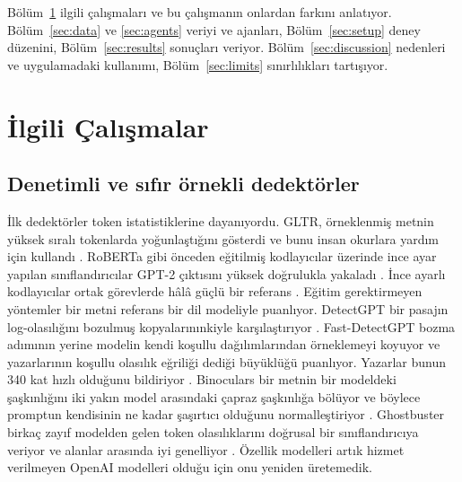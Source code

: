 \documentclass[journal]{IEEEtran}
\begin{document}
Bölüm~\ref{sec:related} ilgili çalışmaları ve bu çalışmanın onlardan farkını anlatıyor. Bölüm~\ref{sec:data} ve
\ref{sec:agents} veriyi ve ajanları, Bölüm~\ref{sec:setup} deney düzenini, Bölüm~\ref{sec:results} sonuçları
veriyor. Bölüm~\ref{sec:discussion} nedenleri ve uygulamadaki kullanımı, Bölüm~\ref{sec:limits} sınırlılıkları
tartışıyor.

\section{İlgili Çalışmalar}\label{sec:related}
\subsection{Denetimli ve sıfır örnekli dedektörler}
İlk dedektörler token istatistiklerine dayanıyordu. GLTR, örneklenmiş metnin yüksek sıralı tokenlarda
yoğunlaştığını gösterdi ve bunu insan okurlara yardım için kullandı \cite{Gehrmann_2019}. RoBERTa \cite{Liu_2019}
gibi önceden eğitilmiş kodlayıcılar üzerinde ince ayar yapılan sınıflandırıcılar GPT-2 çıktısını yüksek doğrulukla
yakaladı \cite{Solaiman_2019}. İnce ayarlı kodlayıcılar ortak görevlerde hâlâ güçlü bir referans
\cite{Wang_SemEval_2024}. Eğitim gerektirmeyen yöntemler bir metni referans bir dil modeliyle puanlıyor. DetectGPT
bir pasajın log-olasılığını bozulmuş kopyalarınınkiyle karşılaştırıyor \cite{Mitchell_2023}. Fast-DetectGPT bozma
adımının yerine modelin kendi koşullu dağılımlarından örneklemeyi koyuyor ve yazarlarının koşullu olasılık eğriliği
dediği büyüklüğü puanlıyor. Yazarlar bunun 340 kat hızlı olduğunu bildiriyor \cite{Bao_2024}. Binoculars bir metnin
bir modeldeki şaşkınlığını iki yakın model arasındaki çapraz şaşkınlığa bölüyor ve böylece promptun kendisinin ne
kadar şaşırtıcı olduğunu normalleştiriyor \cite{Hans_2024}. Ghostbuster birkaç zayıf modelden gelen token
olasılıklarını doğrusal bir sınıflandırıcıya veriyor ve alanlar arasında iyi genelliyor \cite{Verma_2024}. Özellik
modelleri artık hizmet verilmeyen OpenAI modelleri olduğu için onu yeniden üretemedik.
\end{document}
